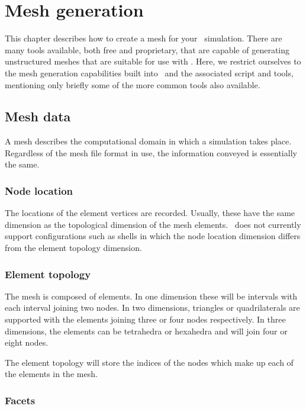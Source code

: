 \chapter{Mesh generation}\label{chap:meshes}

This chapter describes how to create a mesh for your \fluidity\ simulation. There
are many tools available, both free and proprietary, that are capable of generating
unstructured meshes that are suitable for use with \fluidity. Here, we restrict ourselves
to the mesh generation capabilities built into \fluidity\ and the associated script and
tools, mentioning only briefly some of the more common tools also available.

\section{Mesh data}

A mesh describes the computational domain in which a simulation takes
place. Regardless of the mesh file format in use, the information conveyed
is essentially the same.

\subsection{Node location}

The locations of the element vertices are recorded. Usually, these have the
same dimension as the topological dimension of the mesh elements. \fluidity\
does not currently support configurations such as shells in which the node
location dimension differs from the element topology dimension.

\subsection{Element topology}

The mesh is composed of elements. In one dimension these will be intervals
with each interval joining two nodes. In two dimensions, triangles or
quadrilaterals are supported with the elements joining three or four nodes
respectively. In three dimensions, the elements can be tetrahedra or
hexahedra and will join four or eight nodes.

The element topology will store the indices of the nodes which make up
each of the elements in the mesh.

\subsection{Facets}

